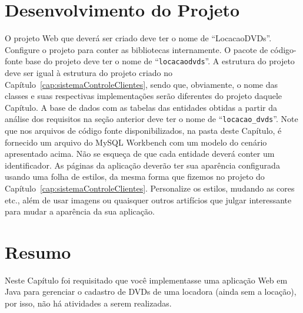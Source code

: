 \section{Desenvolvimento do Projeto}

O projeto Web que deverá ser criado deve ter o nome de ``LocacaoDVDs''. Configure o projeto para conter as bibliotecas internamente. O pacote de código-fonte base do projeto deve ter o nome de ``\texttt{locacaodvds}''. A estrutura do projeto deve ser igual à estrutura do projeto criado no Capítulo~\ref{cap:sistemaControleClientes}, sendo que, obviamente, o nome das classes e suas respectivas implementações serão diferentes do projeto daquele Capítulo. A base de dados com as tabelas das entidades obtidas a partir da análise dos requisitos na seção anterior deve ter o nome de ``\texttt{locacao\_dvds}''. Note que nos arquivos de código fonte disponibilizados, na pasta deste Capítulo, é fornecido um arquivo do MySQL Workbench com um modelo do cenário apresentado acima. Não se esqueça de que cada entidade deverá conter um identificador. As páginas da aplicação deverão ter sua aparência configurada usando uma folha de estilos, da mesma forma que fizemos no projeto do Capítulo~\ref{cap:sistemaControleClientes}. Personalize os estilos, mudando as cores etc., além de usar imagens ou quaisquer outros artifícios que julgar interessante para mudar a aparência da sua aplicação.


\section{Resumo}

Neste Capítulo foi requisitado que você implementasse uma aplicação Web em Java para gerenciar o cadastro de DVDs de uma locadora (ainda sem a locação), por isso, não há atividades a serem realizadas.
